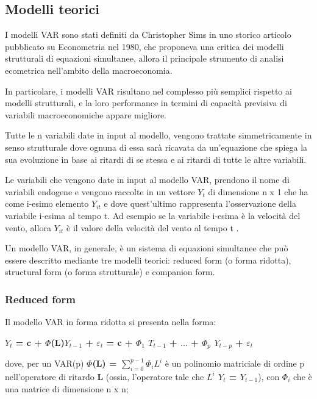 \documentclass[12pt,a4paper,twoside,openright]{book}
\begin{document}
\subsection{Modelli teorici}
I modelli VAR sono stati definiti da Christopher Sims in uno storico articolo pubblicato su Econometria nel 1980, che proponeva una critica dei modelli strutturali di equazioni simultanee, allora il principale strumento di analisi ecometrica nell'ambito della macroeconomia. 

In particolare, i modelli VAR risultano nel complesso più semplici rispetto ai modelli strutturali, e la loro performance in termini di capacità previsiva di variabili macroeconomiche appare migliore.

Tutte le n variabili date in input al modello, vengono trattate simmetricamente in senso strutturale dove ognuna di essa sarà ricavata da un’equazione che spiega la sua evoluzione in base ai ritardi di se stessa e ai ritardi di tutte le altre variabili. 

Le variabili che vengono date in input al modello VAR, prendono il nome di variabili endogene e vengono raccolte in un vettore $Y_{t}$ di dimensione n x 1 che ha come i-esimo elemento $Y_{it}$ e dove quest’ultimo rappresenta l’osservazione della variabile i-esima al tempo t. Ad esempio se la variabile i-esima è la velocità del vento, allora $Y_{it}$ è il valore della velocità del vento al tempo t \cite{9a} \cite {10a}. 

Un modello VAR, in generale, è un sistema di equazioni simultanee che può essere descritto mediante tre modelli teorici: reduced form (o forma ridotta), structural form (o forma strutturale) e companion form.  
\subsubsection{Reduced form}
Il modello VAR in forma ridotta si presenta nella forma:
\begin{center}
{\bfseries  $Y_{t}$ = c + $\Phi$(L)$Y_{t-1}$ + $\varepsilon_{t}$ = c + $\Phi_{1}$ $T_{t-1}$ + $\dots$ + $\Phi_{p}$ $Y_{t-p}$ + $\varepsilon_{t}$ }
\end{center}

dove, per un  VAR(p) {\bfseries  $\Phi$(L) = $\sum_{i=0}^{p-1}{\Phi_{i} L^{i}}$} è un polinomio matriciale di ordine p nell'operatore di ritardo {\bfseries L} (ossia, l'operatore tale che {\bfseries $L^{i}$ $Y_{t}$ = $Y_{t-1}$}), con {\bfseries $\Phi_{i}$} che è una matrice di dimensione n x n; 
\end{document}
